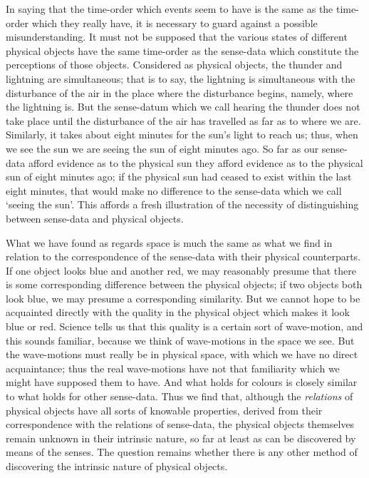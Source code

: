 \documentclass[oneside,letterpaper,12pt]{book}
\begin{document}
In saying that the time-order which events seem to have is the same as
the time-order which they really have, it is necessary to guard against
a possible misunderstanding. It must not be supposed that the various
states of different physical objects have the same time-order as the
sense-data which constitute the perceptions of those objects. \label{thunder} Considered
as physical objects, the thunder and lightning are simultaneous; that is
to say, the lightning is simultaneous with the disturbance of the air in
the place where the disturbance begins, namely, where the lightning is.
But the sense-datum which we call hearing the thunder does not take
place until the disturbance of the air has travelled as far as to where
we are. Similarly, it takes about eight minutes for the
sun's light to reach us; thus, when we see the sun we
are seeing the sun of eight minutes ago. So far as our sense-data afford
evidence as to the physical sun they afford evidence as to the physical
sun of eight minutes ago; if the physical sun had ceased to exist within
the last eight minutes, that would make no difference to the sense-data
which we call `seeing the sun'. This
affords a fresh illustration of the necessity of distinguishing between
sense-data and physical objects.

What we have found as regards space is much the same as what we find in
relation to the correspondence of the sense-data with their physical
counterparts. \label{similarity} If one object looks blue and another red, we may
reasonably presume that there is some corresponding difference between
the physical objects; if two objects both look blue, we may presume a
corresponding similarity. But we cannot hope to be acquainted directly
with the quality in the physical object which makes it look blue or red.
Science tells us that this quality is a certain sort of wave-motion, and
this sounds familiar, because we think of wave-motions in the space we
see. But the wave-motions must really be in physical space, with which
we have no direct acquaintance; thus the real wave-motions have not that
familiarity which we might have supposed them to have. And what holds
for colours is closely similar to what holds for other sense-data. \label{relations} Thus
we find that, although the \emph{relations} of physical objects have all
sorts of knowable properties, derived from their correspondence with the
relations of sense-data, the physical objects themselves remain unknown
in their intrinsic nature, so far at least as can be discovered by means
of the senses. The question remains whether there is any other method of
discovering the intrinsic nature of physical objects.
\end{document}
